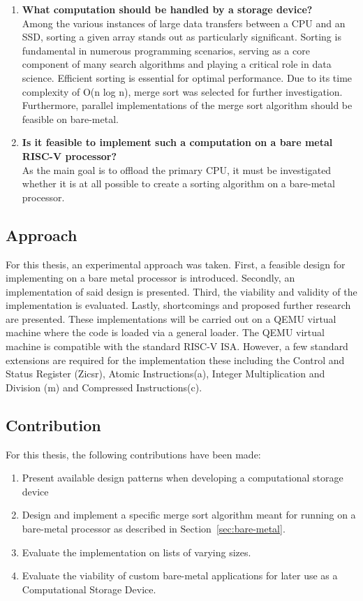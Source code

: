\begin{enumerate}
  \item {\large \textbf{What computation should be handled by a storage
    device?}}\label{sec:computational} \\
    Among the various instances of large data transfers between a CPU and an SSD,
    sorting a given array stands out as particularly significant. Sorting is
    fundamental in numerous programming scenarios, serving as a core component of
    many search algorithms and playing a critical role in data science. Efficient
    sorting is essential for optimal performance. Due to its time complexity of O(n
    log n), merge sort was selected for further investigation. Furthermore, parallel
    implementations of the merge sort algorithm should be feasible on
    bare-metal.
  \item {\large \textbf{ Is it feasible to implement such a computation on a
    bare metal RISC-V processor?}} \\
    As the main goal is to offload the primary CPU, it must be investigated
    whether it is at all possible to create a sorting algorithm on a bare-metal
    processor.
\end{enumerate}


\subsection{Approach}\label{sec:approach}
For this thesis, an experimental approach was taken. First, a feasible design
for implementing on a bare metal processor is introduced. Secondly, an
implementation of said design is presented. Third, the viability and validity
of the implementation is evaluated. Lastly, shortcomings and proposed further
research are presented. These implementations will be carried out on a QEMU
virtual machine where the code is loaded via a general loader. The QEMU virtual
machine is compatible with the standard RISC-V ISA. However, a few standard
extensions are required for the implementation these including the Control and
Status Register (Zicsr), Atomic Instructions(a), Integer Multiplication and
Division (m) and Compressed Instructions(c).

\subsection{Contribution}
For this thesis, the following contributions have been made:
\begin{enumerate}
  \item Present available design patterns when developing a computational
    storage device
  \item Design and implement a specific merge sort algorithm meant for running on a
    bare-metal processor as described in Section~\ref{sec:bare-metal}.
  \item Evaluate the implementation on lists of varying sizes.
  \item Evaluate the viability of custom bare-metal applications for later use
    as a Computational Storage Device.
\end{enumerate}


